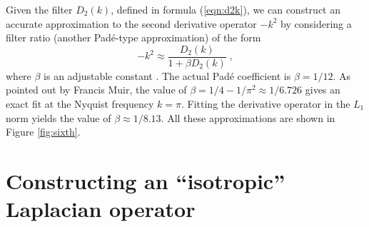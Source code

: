 Given the filter $D_2 (k)$, defined in formula (\ref{eqn:d2k}), we can
construct an accurate approximation to the second derivative operator
$-k^2$ by considering a filter ratio (another Pad\'{e}-type
approximation) of the form
\begin{equation}
  \label{eqn:ratio}
  -k^2 \approx \frac{D_2(k)}{1 + \beta D_2 (k)}\;,
\end{equation}
where $\beta$ is an adjustable constant \cite{Claerbout.blackwell.85}.
The actual Pad\'{e} coefficient is $\beta=1/12$.  As pointed out by
Francis Muir, the value of $\beta = 1/4 - 1/\pi^2 \approx 1/6.726$
gives an exact fit at the Nyquist frequency $k = \pi$. Fitting the
derivative operator in the $L_1$ norm yields the value of $\beta
\approx 1/8.13$. All these approximations are shown in Figure
\ref{fig:sixth}.


\section{Constructing an ``isotropic'' Laplacian operator}

